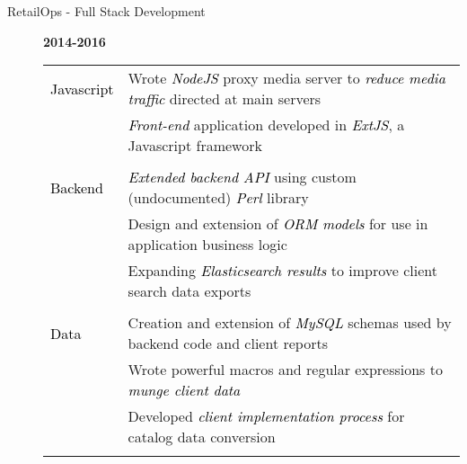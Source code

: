 \documentclass[12pt]{article}
\begin{document}
\begin{description}
\begin{description}
                \item[RetailOps - Full Stack Development] \hfill \textbf{2014-2016}\\
		\textcolor{gray}{
                    \begin{tabular}{l|l}
				\\[-1.0mm]
                        \textcolor{black}{Javascript} & Wrote \textcolor{black}{\textit{NodeJS}} proxy media server to \textcolor{black}{\textit{reduce media traffic}} directed at main servers \\
				   & \textcolor{black}{\textit{Front-end}} application developed in \textcolor{black}{\textit{ExtJS}}, a Javascript framework\\
				\\[-1.7mm]
                        \textcolor{black}{Backend}    & \textcolor{black}{\textit{Extended backend API}} using custom (undocumented) \textcolor{black}{\textit{Perl}} library\\
                                   & Design and extension of \textcolor{black}{\textit{ORM models}} for use in application business logic \\
                                   & Expanding \textcolor{black}{\textit{Elasticsearch results}} to improve client search data exports\\
				\\[-1.7mm]
                        \textcolor{black}{Data}       & Creation and extension of \textcolor{black}{\textit{MySQL}} schemas used by backend code and client reports\\
				   & Wrote powerful macros and regular expressions to \textcolor{black}{\textit{munge client data}}\\
				   & Developed \textcolor{black}{\textit{client implementation process}} for catalog data conversion\\
				\\[-1.0mm]
                    \end{tabular}
		}
            \end{description}


\end{description}
\end{document}
